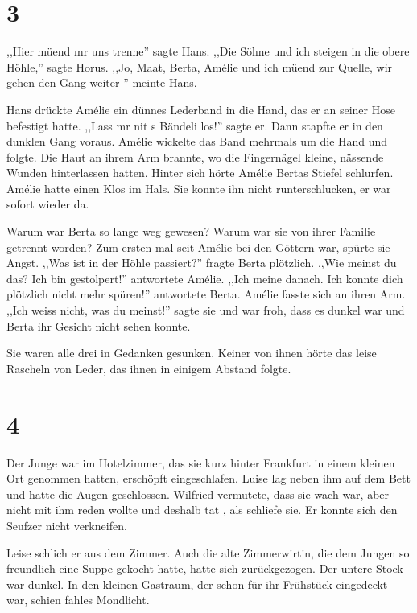 \documentclass[11pt,titlepage,a5paper]{book}
\begin{document}
\section*{3}

,,Hier müend mr uns trenne'' sagte Hans. ,,Die Söhne und ich steigen in die obere Höhle,'' sagte Horus. ,,Jo, Maat, Berta, Amélie und ich müend zur Quelle, wir gehen den Gang weiter '' meinte Hans.

Hans drückte Amélie ein dünnes Lederband in die Hand, das er an seiner Hose befestigt hatte. ,,Lass mr nit s Bändeli los!'' sagte er. Dann stapfte er in den dunklen Gang voraus. Amélie wickelte das Band mehrmals um die Hand und folgte. Die Haut an ihrem Arm brannte, wo die Fingernägel kleine, nässende Wunden hinterlassen hatten. Hinter sich hörte Amélie Bertas Stiefel schlurfen. Amélie hatte einen Klos im Hals. Sie konnte ihn nicht runterschlucken, er war sofort wieder da.

Warum war Berta so lange weg gewesen? Warum war sie von ihrer Familie getrennt worden? Zum ersten mal seit Amélie bei den Göttern war, spürte sie Angst. ,,Was ist in der Höhle passiert?'' fragte Berta plötzlich. ,,Wie meinst du das? Ich bin gestolpert!'' antwortete Amélie. ,,Ich meine danach. Ich konnte dich plötzlich nicht mehr spüren!'' antwortete Berta. Amélie fasste sich an ihren Arm. ,,Ich weiss nicht, was du meinst!'' sagte sie und war froh, dass es dunkel war und Berta ihr Gesicht nicht sehen konnte.

Sie waren alle drei in Gedanken gesunken. Keiner von ihnen hörte das leise Rascheln von Leder, das ihnen in einigem Abstand folgte.

\section*{4}

Der Junge war im Hotelzimmer, das sie kurz hinter Frankfurt in einem kleinen Ort genommen hatten, erschöpft eingeschlafen. Luise lag neben ihm auf dem Bett und hatte die Augen geschlossen. Wilfried vermutete, dass sie wach war, aber nicht mit ihm reden wollte und deshalb tat , als schliefe sie. Er konnte sich den Seufzer nicht verkneifen.

Leise schlich er aus dem Zimmer. Auch die alte Zimmerwirtin, die dem Jungen so freundlich eine Suppe gekocht hatte, hatte sich zurückgezogen. Der untere Stock war dunkel. In den kleinen Gastraum, der schon für ihr Frühstück eingedeckt war, schien fahles Mondlicht.
\end{document}
